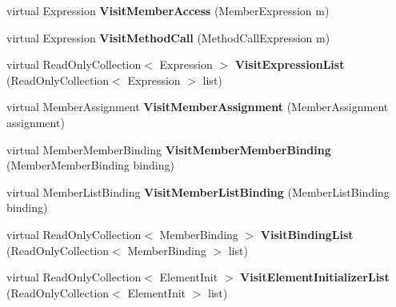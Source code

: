 \begin{DoxyCompactItemize}
\item 
\mbox{\label{class_linq_1_1_expression_tree_visitor_ad911586e17f3f88f3cc191ac6f99175a}} 
virtual Expression {\bfseries Visit\+Member\+Access} (Member\+Expression m)
\item 
\mbox{\label{class_linq_1_1_expression_tree_visitor_a410dd70d71a8f2ef3939f4ed6a5118f7}} 
virtual Expression {\bfseries Visit\+Method\+Call} (Method\+Call\+Expression m)
\item 
\mbox{\label{class_linq_1_1_expression_tree_visitor_a89c4c7324c509f98126b357c52a81e8e}} 
virtual Read\+Only\+Collection$<$ Expression $>$ {\bfseries Visit\+Expression\+List} (Read\+Only\+Collection$<$ Expression $>$ list)
\item 
\mbox{\label{class_linq_1_1_expression_tree_visitor_a39b68ec5e425eb2769051aa6e30a5dac}} 
virtual Member\+Assignment {\bfseries Visit\+Member\+Assignment} (Member\+Assignment assignment)
\item 
\mbox{\label{class_linq_1_1_expression_tree_visitor_af9209d068cbbe9cf9af522a1a947fcde}} 
virtual Member\+Member\+Binding {\bfseries Visit\+Member\+Member\+Binding} (Member\+Member\+Binding binding)
\item 
\mbox{\label{class_linq_1_1_expression_tree_visitor_a88b8c0684ccbb59dda2b3cbab53581c0}} 
virtual Member\+List\+Binding {\bfseries Visit\+Member\+List\+Binding} (Member\+List\+Binding binding)
\item 
\mbox{\label{class_linq_1_1_expression_tree_visitor_af6a665d4b5fd8ecccbc1541cad5c0d16}} 
virtual Read\+Only\+Collection$<$ Member\+Binding $>$ {\bfseries Visit\+Binding\+List} (Read\+Only\+Collection$<$ Member\+Binding $>$ list)
\item 
\mbox{\label{class_linq_1_1_expression_tree_visitor_add7ecba789729c974b9a65d3f2aae3df}} 
virtual Read\+Only\+Collection$<$ Element\+Init $>$ {\bfseries Visit\+Element\+Initializer\+List} (Read\+Only\+Collection$<$ Element\+Init $>$ list)

\end{DoxyCompactItemize}
